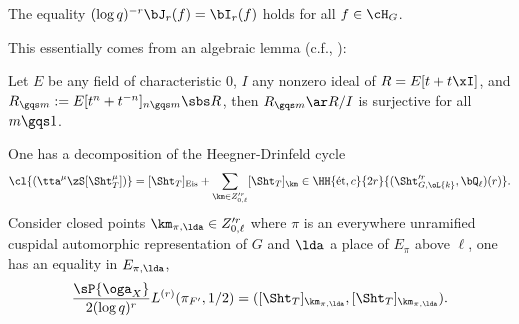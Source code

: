 \documentclass[a4paper, twoside]{article}
\begin{document}

\begin{thm}
	The equality $(\log{q})^{-r}\bJ_{r}(f)=\bI_{r}(f)$ holds for all $f\in\cH_{G}$.
\end{thm}
\begin{rmk}
	This essentially comes from an algebraic lemma (c.f., \cite[Lemma~9.1]{YZShtukas1}):

	Let $E$ be any field of characteristic $0$, $I$ any nonzero ideal of $R=E[t+t\xI]$, and $R_{\gqs m}:=E[t^{n}+t^{-n}]_{n\gqs m}\sbs R$, then $R_{\gqs m}\ar R/I$ is surjective for all $m\gqs1$.
\end{rmk}

\begin{thm}
	One has a decomposition of the Heegner-Drinfeld cycle
	\[
		\cl{(\tta^{\mu}\zS[\Sht_{T}^{\mu}])}=[\Sht_{T}]_{\mathrm{Eis}}+\sum_{\km\in Z_{0,\ell}^{\prime r}}[\Sht_{T}]_{\km}\in\HH{\text{{\'e}t},c}{2r}{(\Sht_{G,\oL{k}}^{\prime r},\bQ_{\ell})(r)}.
	\]
	Consider closed points $\km_{\pi,\lda}\in Z_{0,\ell}^{\prime r}$ where $\pi$ is an everywhere unramified cuspidal automorphic representation of $G$ and $\lda$ a place of $E_{\pi}$ above $\ell$, one has an equality in $E_{\pi,\lda}$,
	\[
		\frac{\sP{\oga_{X}}}{2(\log{q})^{r}}L^{(r)}(\pi_{F'},1/2)=([\Sht_{T}]_{\km_{\pi,\lda}},[\Sht_{T}]_{\km_{\pi,\lda}}).
	\]
\end{thm}



\printref
\end{document}

